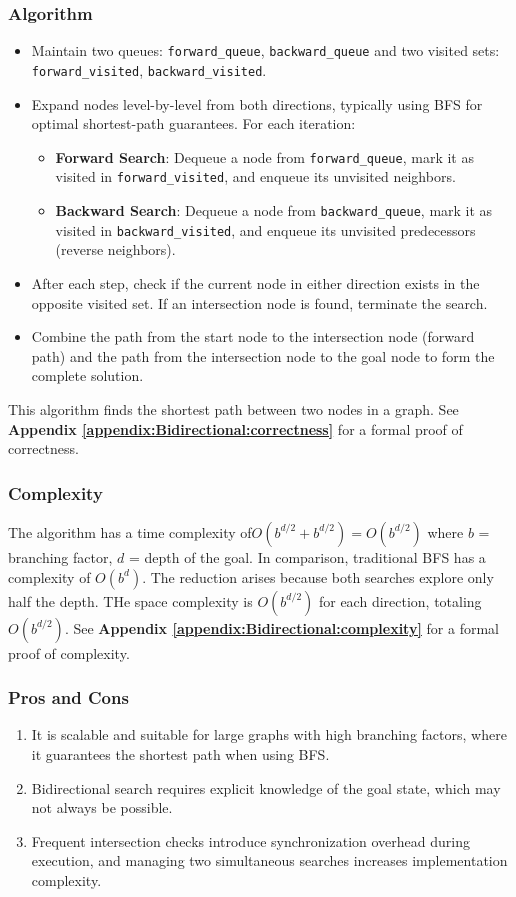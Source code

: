 		\subsubsection{Algorithm}
			\begin{itemize}
				\item Maintain two queues: \texttt{forward\_queue}, \texttt{backward\_queue} and two visited sets: \texttt{forward\_visited}, \texttt{backward\_visited}.
				\item Expand nodes level-by-level from both directions, typically using BFS for optimal shortest-path guarantees. For each iteration:
				\begin{itemize}
					\item \textbf{Forward Search}: Dequeue a node from \texttt{forward\_queue}, mark it as visited in \texttt{forward\_visited}, and enqueue its unvisited neighbors.
					\item \textbf{Backward Search}: Dequeue a node from \texttt{backward\_queue}, mark it as visited in \texttt{backward\_visited}, and enqueue its unvisited predecessors (reverse neighbors).
				\end{itemize}
				\item After each step, check if the current node in either direction exists in the opposite visited set. If an intersection node is found, terminate the search.
				\item Combine the path from the start node to the intersection node (forward path) and the path from the intersection node to the goal node to form the complete solution.
			\end{itemize}
		This algorithm finds the shortest path between two nodes in a graph. See \textbf{Appendix \ref{appendix:Bidirectional:correctness}} for a formal proof of correctness.
		
		\subsubsection{Complexity}
			The algorithm has a time complexity of$O(b^{d/2} + b^{d/2}) = O(b^{d/2})$ where $b$ = branching factor, $d$ = depth of the goal.
			In comparison, traditional BFS has a complexity of $O(b^d)$.
			The reduction arises because both searches explore only half the depth. THe space complexity is $O(b^{d/2})$ for each direction, totaling $O(b^{d/2})$. See \textbf{Appendix \ref{appendix:Bidirectional:complexity}} for a formal proof of complexity.
	    
	
		\subsubsection{Pros and Cons}
		\begin{enumerate}
			\item It is scalable and suitable for large graphs with high branching factors, where it guarantees the shortest path when using BFS.
			\item Bidirectional search requires explicit knowledge of the goal state, which may not always be possible.
			\item Frequent intersection checks introduce synchronization overhead during execution, and managing two simultaneous searches increases implementation complexity.
		\end{enumerate}
